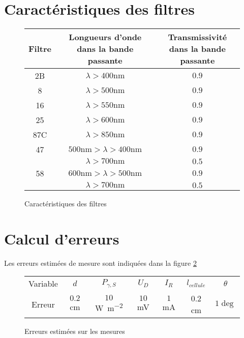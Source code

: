 \section{Caractéristiques des filtres}

\begin{figure}[h]
\centering
\begin{tabulary}{0.7\linewidth}{C C C}
    \toprule
    Filtre & Longueurs d'onde dans la bande passante & Transmissivité dans la bande passante \\
    \midrule
    2B  & $\lambda > 400 \unit{\nano \metre}$ & $0.9$ \\
    8   & $\lambda > 500 \unit{\nano \metre}$ & $0.9$ \\
    16  & $\lambda > 550 \unit{\nano \metre}$ & $0.9$ \\
    25  & $\lambda > 600 \unit{\nano \metre}$ & $0.9$ \\
    87C & $\lambda > 850 \unit{\nano \metre}$ & $0.9$ \\
    47  & $500 \unit{\nano \metre} > \lambda > 400 \unit{\nano \metre}$ & $0.9$ \\
        & $\lambda > 700 \unit{\nano \metre}$ & $0.5$ \\
    58  & $600 \unit{\nano \metre} > \lambda > 500 \unit{\nano \metre}$ & $0.9$ \\
        & $\lambda > 700 \unit{\nano \metre}$ & $0.5$ \\
    \bottomrule
    \end{tabulary}
    \caption{Caractéristiques des filtres \cite{notice}}
    \label{tab:filters}
\end{figure}

\section{Calcul d'erreurs}

Les erreurs estimées de mesure sont indiquées dans la figure \ref{tab:erreurs}

\begin{figure}[H]
    \centering
    \begin{tabulary}{0.7\linewidth}{C C C C C C C}
        \toprule
        Variable & \(d\)      & \(P_{\gamma,S}\) & \(U_D\)   & \(I_R\)  & \(l_{cellule}\) & \(\theta\) \\
        Erreur   & \(0.2\) cm & \(10\) \unit{\watt \per \meter^2}        & \(10\) \unit{\milli\volt} & \(1\) \unit{\milli\ampere} & 0.2 \unit{\centi\meter}      & \(1 \deg\) \\
        \bottomrule
    \end{tabulary}
    \caption{Erreurs estimées sur les mesures}
    \label{tab:erreurs}
\end{figure}

